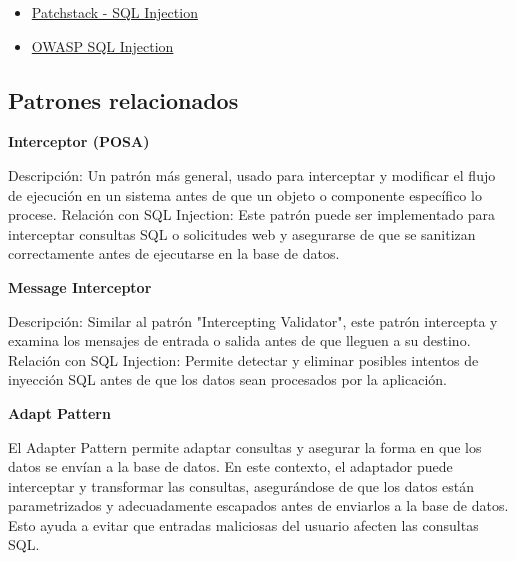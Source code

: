 \begin{itemize}
    \item \href{https://patchstack.com/academy/wordpress/vulnerabilities/sql-injection/}{Patchstack - SQL Injection}
    \item \href{https://cheatsheetseries.owasp.org/cheatsheets/SQL\_Injection\_Prevention\_Cheat\_Sheet.html}{OWASP SQL Injection}
\end{itemize}

\subsection{Patrones relacionados}

\textbf{Interceptor (POSA)} 

Descripción: Un patrón más general, usado para interceptar y modificar el flujo de ejecución en un sistema antes de que un objeto o componente específico lo procese.
Relación con SQL Injection: Este patrón puede ser implementado para interceptar consultas SQL o solicitudes web y asegurarse de que se sanitizan correctamente antes de ejecutarse en la base de datos.

\textbf{Message Interceptor}

Descripción: Similar al patrón "Intercepting Validator", este patrón intercepta y examina los mensajes de entrada o salida antes de que lleguen a su destino.
Relación con SQL Injection: Permite detectar y eliminar posibles intentos de inyección SQL antes de que los datos sean procesados por la aplicación.

\textbf{Adapt Pattern}

El Adapter Pattern permite adaptar consultas y asegurar la forma en que los datos se envían a la base de datos. En este contexto, el adaptador puede interceptar y transformar las consultas, asegurándose de que los datos están parametrizados y adecuadamente escapados antes de enviarlos a la base de datos. Esto ayuda a evitar que entradas maliciosas del usuario afecten las consultas SQL.
